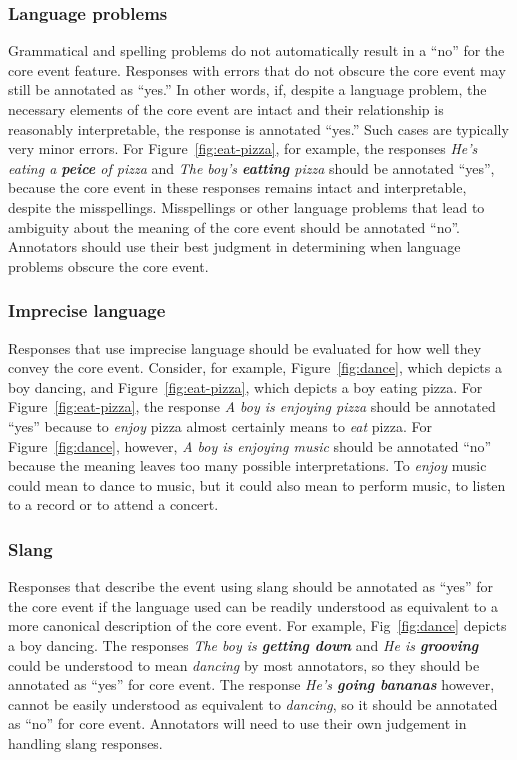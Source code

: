 \documentclass[12pt,notitlepage]{article}
\newcommand{\lk}[1]{\marginpar{\linespread{1}\scriptsize LK: #1}}
\begin{document}
\subsubsection{Language problems} Grammatical and spelling problems do not automatically result in a ``no'' for the core event feature. Responses with errors that do not obscure the core event may still be annotated as ``yes.'' In other words, if, despite a language problem, the necessary elements of the core event are intact and their relationship is reasonably interpretable, the response is annotated ``yes.'' Such cases are typically very minor errors. For Figure~\ref{fig:eat-pizza}, for example, the responses \textit{He's eating a \textbf{peice} of pizza} and \textit{The boy's \textbf{eatting} pizza} should be annotated ``yes'', because the core event in these responses remains intact and interpretable, despite the misspellings. Misspellings or other language problems that lead to ambiguity about the meaning of the core event should be annotated ``no''. Annotators should use their best judgment in determining when language problems obscure the core event.

\subsubsection{Imprecise language} Responses that use imprecise language should be evaluated for how well they convey the core event. Consider, for example, Figure~\ref{fig:dance}, which depicts a boy dancing, and Figure~\ref{fig:eat-pizza}, which depicts a boy eating pizza. For Figure~\ref{fig:eat-pizza}, the response \textit{A boy is enjoying pizza} should be annotated ``yes'' because to \textit{enjoy} pizza almost certainly means to \textit{eat} pizza. For Figure~\ref{fig:dance}, however, \textit{A boy is enjoying music} should be annotated ``no'' because the meaning leaves too many possible interpretations. To \textit{enjoy} music could mean to dance to music, but it could also mean to perform music, to listen to a record or to attend a concert.

\subsubsection{Slang} Responses that describe the event using slang should be annotated as ``yes'' for the core event if the language used can be readily understood as equivalent to a more canonical description of the core event. For example, Fig~\ref{fig:dance} depicts a boy dancing. The responses \textit{The boy is \textbf{getting down}} and \textit{He is \textbf{grooving}} could be understood to mean \textit{dancing} by most annotators, so they should be annotated as ``yes'' for core event. The response \textit{He's \textbf{going bananas}} however, cannot be easily understood as equivalent to \textit{dancing}, so it should be annotated as ``no'' for core event. Annotators will need to use their own judgement in handling slang responses.
\end{document}
